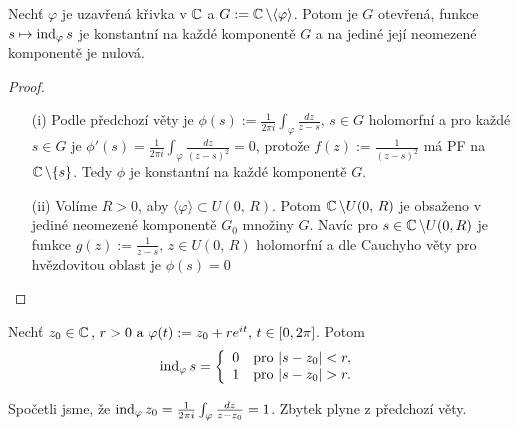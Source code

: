 \begin{theorem}
 Nechť $\varphi$ je uzavřená křivka v $\operatorname{\mathbb{C}}  $ a $G:=\operatorname{\mathbb{C}}  \backslash\langle\varphi\rangle$. %
Potom je $G$ otevřená, funkce $s\mapsto \operatorname{ind}_{\varphi} s$ je konstantní na každé komponentě $G$ a na jediné její neomezené komponentě je nulová. 
\end{theorem}
\begin{proof}
\begin{itemize}
    \item[(i)] Podle předchozí věty je $\phi(s):=\frac{1}{2\pi i}\int_{\varphi}\frac{dz}{z-s}\text{, }s\in G$  %
    holomorfní a pro každé $s\in G$ je $\phi'(s)=\frac{1}{2\pi i}\int_{\varphi}\frac{dz}{(z-s)^2}=0$, protože $f(z):=\frac{1}{(z-s)^2}$ má PF na $\operatorname{\mathbb{C}}  \backslash\{s\}$. %
    Tedy $\phi$ je konstantní na každé komponentě $G$.
    \item[(ii)]%
    Volíme $R>0$, aby $\langle\varphi\rangle\subset U(0,\, R)$. Potom $\operatorname{\mathbb{C}}  \backslash U(0,\, R)$ je obsaženo v jediné neomezené komponentě $G_{0}$ množiny $G$. Navíc pro $s\in\operatorname{\mathbb{C}}  \backslash U(0,R)$ je funkce $g(z):=\frac{1}{z-s}\text{, }z\in U(0,\, R)$ holomorfní a dle Cauchyho věty pro hvězdovitou oblast %
    je $\phi(s)=0$
\end{itemize}

\end{proof}

\begin{example}
Nechť $z_{0}\in\operatorname{\mathbb{C}}  \text{, }r>0\text{ a }\varphi(t):=z_{0}+r e^{it}\text{, }t\in [0,2\pi]$. %
Potom $$\ind_{\varphi}s=
\twopartdef
{0}{|s-z_{0}|<r,}  %
{1}{|s-z_{0}|>r.}$$ %

Spočetli jsme, že
$\operatorname{ind}_{\varphi}z_{0}=\frac{1}{2\pi i}\int_{\varphi}\frac{dz}{z-z_{0}}=1$.
Zbytek plyne z předchozí věty.
\end{example}